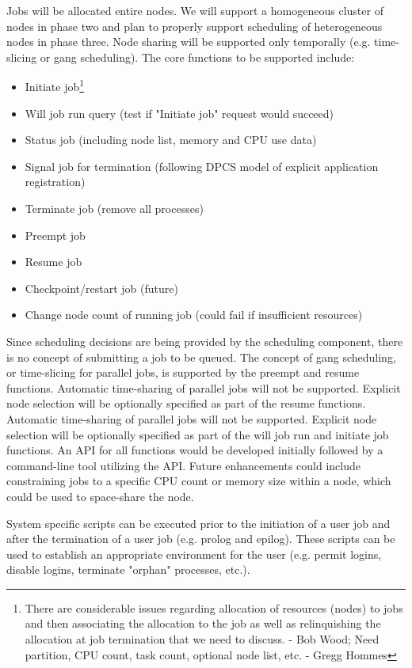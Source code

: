 Jobs will be allocated entire nodes. We will support a homogeneous cluster of
nodes in phase two and plan to properly support scheduling of heterogeneous
nodes in phase three. Node sharing will be supported only temporally (e.g.
time-slicing or  gang scheduling). The core functions to be supported include:
\begin{itemize}
\item Initiate job\footnote{There are considerable issues regarding allocation 
of resources (nodes) to jobs and then associating the  allocation to the job 
as well as relinquishing the allocation at job termination that we need to 
discuss. - Bob Wood; Need partition, CPU count, task count, optional node 
list, etc.  - Gregg Hommes}
\item Will job run query (test if "Initiate job" request would succeed)
\item Status job (including node list, memory and CPU use data)
\item Signal job for termination (following DPCS model of explicit application
registration)
\item Terminate job (remove all processes)
\item Preempt job 
\item Resume job
\item Checkpoint/restart job (future)
\item Change node count of running job (could fail if insufficient resources)
\end{itemize}

Since scheduling decisions are being provided by the scheduling component,
there is no concept of submitting a job to be queued. The concept of gang
scheduling, or time-slicing for parallel jobs, is supported by the preempt and
resume functions. Automatic time-sharing of parallel jobs will not be
supported. Explicit node selection will be optionally specified as part of the
resume functions. Automatic time-sharing of parallel jobs will not be
supported. Explicit node selection will be optionally specified as part of the
will job run and initiate job functions. An API for all functions would be
developed initially followed by a  command-line tool utilizing the API. Future
enhancements could include constraining jobs to a specific CPU count or memory
size within a node, which could be used to space-share the node.

System specific scripts can be executed prior to the initiation of a user job
and after the termination of a user job (e.g. prolog and epilog). These scripts
can be used to establish an appropriate environment for the user (e.g. permit
logins, disable logins, terminate "orphan" processes, etc.). 

